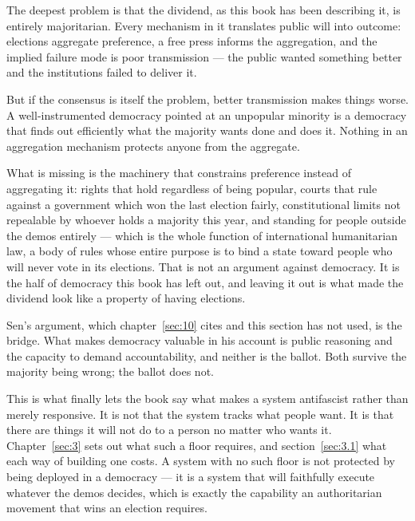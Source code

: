 The deepest problem is that the dividend, as this book has been describing it, is entirely majoritarian. Every mechanism in it translates public will into outcome: elections aggregate preference, a free press informs the aggregation, and the implied failure mode is poor transmission — the public wanted something better and the institutions failed to deliver it.

But if the consensus is itself the problem, better transmission makes things worse. A well-instrumented democracy pointed at an unpopular minority is a democracy that finds out efficiently what the majority wants done and does it. Nothing in an aggregation mechanism protects anyone from the aggregate.

What is missing is the machinery that constrains preference instead of aggregating it: rights that hold regardless of being popular, courts that rule against a government which won the last election fairly, constitutional limits not repealable by whoever holds a majority this year, and standing for people outside the demos entirely — which is the whole function of international humanitarian law, a body of rules whose entire purpose is to bind a state toward people who will never vote in its elections. That is not an argument against democracy. It is the half of democracy this book has left out, and leaving it out is what made the dividend look like a property of having elections.

Sen's argument, which chapter~\ref{sec:10} cites and this section has not used, is the bridge. What makes democracy valuable in his account is public reasoning and the capacity to demand accountability, and neither is the ballot. Both survive the majority being wrong; the ballot does not.

This is what finally lets the book say what makes a system antifascist rather than merely responsive. It is not that the system tracks what people want. It is that there are things it will not do to a person no matter who wants it. Chapter~\ref{sec:3} sets out what such a floor requires, and section~\ref{sec:3.1} what each way of building one costs. A system with no such floor is not protected by being deployed in a democracy — it is a system that will faithfully execute whatever the demos decides, which is exactly the capability an authoritarian movement that wins an election requires.
